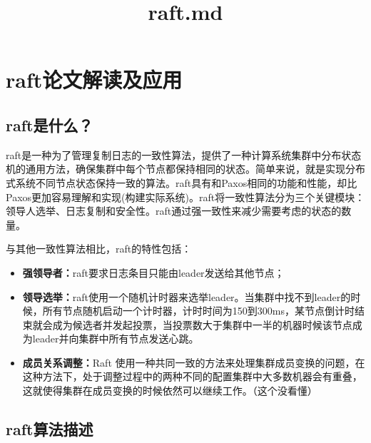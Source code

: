 \documentclass[
]{article}
\title{raft.md}
\author{}
\date{}
\begin{document}
\maketitle

\hypertarget{header-n0}{%
\section{raft论文解读及应用}\label{header-n0}}

\tableofcontents

\hypertarget{header-n4}{%
\subsection{raft是什么？}\label{header-n4}}

raft是一种为了管理复制日志的一致性算法，提供了一种计算系统集群中分布状态机的通用方法，确保集群中每个节点都保持相同的状态。简单来说，就是实现分布式系统不同节点状态保持一致的算法。raft具有和Paxos相同的功能和性能，却比Paxos更加容易理解和实现(构建实际系统)。raft将一致性算法分为三个关键模块：领导人选举、日志复制和安全性。raft通过强一致性来减少需要考虑的状态的数量。

与其他一致性算法相比，raft的特性包括：

\begin{itemize}
\item
  \textbf{强领导者：}raft要求日志条目只能由leader发送给其他节点；
\item
  \textbf{领导选举：}raft使用一个随机计时器来选举leader。当集群中找不到leader的时候，所有节点随机启动一个计时器，计时时间为150到300ms，某节点倒计时结束就会成为候选者并发起投票，当投票数大于集群中一半的机器时候该节点成为leader并向集群中所有节点发送心跳。
\item
  \textbf{成员关系调整：}Raft
  使用一种共同一致的方法来处理集群成员变换的问题，在这种方法下，处于调整过程中的两种不同的配置集群中大多数机器会有重叠，这就使得集群在成员变换的时候依然可以继续工作。（这个没看懂）
\end{itemize}

\hypertarget{header-n15}{%
\subsection{raft算法描述}\label{header-n15}}
\end{document}
